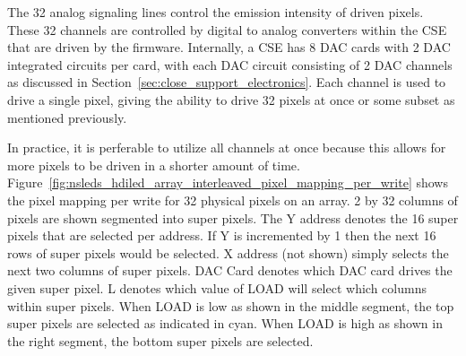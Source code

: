     The 32 analog signaling lines control the emission intensity of driven pixels. These 32 channels are controlled by digital to analog converters within the CSE that are driven by the firmware. Internally, a CSE has 8 DAC cards with 2 DAC integrated circuits per card, with each DAC circuit consisting of 2 DAC channels as discussed in Section~\ref{sec:close_support_electronics}. Each channel is used to drive a single pixel, giving the ability to drive 32 pixels at once or some subset as mentioned previously.

    In practice, it is perferable to utilize all channels at once because this allows for more pixels to be driven in a shorter amount of time. Figure~\ref{fig:nsleds_hdiled_array_interleaved_pixel_mapping_per_write} shows the pixel mapping per write for 32 physical pixels on an array. 2 by 32 columns of pixels are shown segmented into super pixels. The Y address denotes the 16 super pixels that are selected per address. If Y is incremented by 1 then the next 16 rows of super pixels would be selected. X address (not shown) simply selects the next two columns of super pixels. DAC Card denotes which DAC card drives the given super pixel. L denotes which value of LOAD will select which columns within super pixels. When LOAD is low as shown in the middle segment, the top super pixels are selected as indicated in cyan. When LOAD is high as shown in the right segment, the bottom super pixels are selected.

